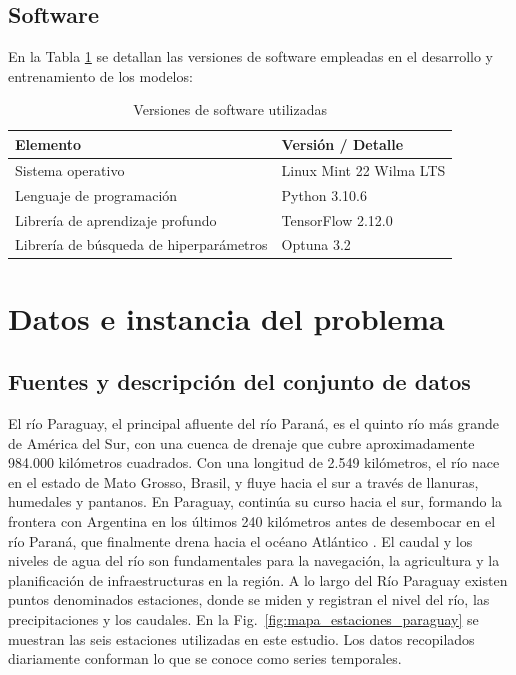 \subsection{Software}
\label{ssec:software}

En la Tabla \ref{tab:software} se detallan las versiones de software empleadas en el desarrollo y entrenamiento de los modelos:

\begin{table}[h]
  \centering
  \caption{Versiones de software utilizadas}
  \label{tab:software}
  \begin{tabular}{@{}ll@{}}
    \toprule
    \textbf{Elemento}                   & \textbf{Versión / Detalle} \\
    \midrule
    Sistema operativo                   & Linux Mint 22 Wilma LTS \\
    Lenguaje de programación            & Python 3.10.6 \\
    Librería de aprendizaje profundo    & TensorFlow 2.12.0 \\
    Librería de búsqueda de hiperparámetros & Optuna 3.2 \\
    \bottomrule
  \end{tabular}
\end{table}


\section{Datos e instancia del problema}
\label{sec:datos_instancia}

\subsection{Fuentes y descripción del conjunto de datos}
\label{ssec:fuentes_datos}

El río Paraguay, el principal afluente del río Paraná, es el quinto río más grande de América del Sur, con una cuenca de drenaje que cubre aproximadamente 984.000 kilómetros cuadrados. Con una longitud de 2.549 kilómetros, el río nace en el estado de Mato Grosso, Brasil, y fluye hacia el sur a través de llanuras, humedales y pantanos. En Paraguay, continúa su curso hacia el sur, formando la frontera con Argentina en los últimos 240 kilómetros antes de desembocar en el río Paraná, que finalmente drena hacia el océano Atlántico
\cite{paraguayriverbritannica}. El caudal y los niveles de agua del río son fundamentales para la navegación, la agricultura y la planificación de infraestructuras en la región.
A lo largo del Río Paraguay existen puntos denominados estaciones, donde se miden y registran el nivel del río, las precipitaciones y los caudales. En la Fig.~\ref{fig:mapa_estaciones_paraguay} se muestran las seis estaciones utilizadas en este estudio. Los datos recopilados diariamente conforman lo que se conoce como series temporales.

